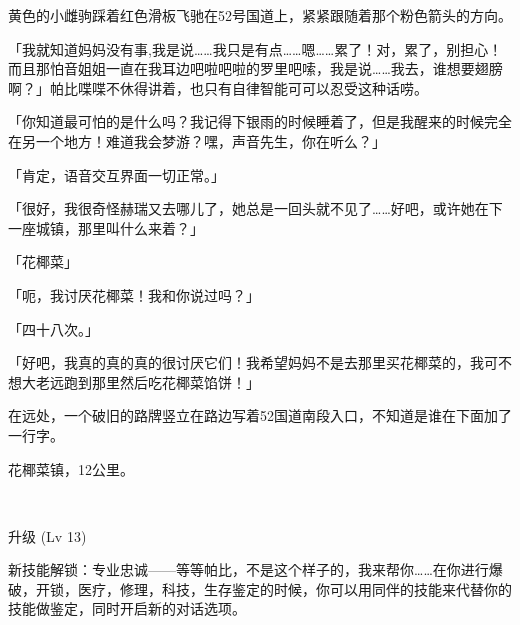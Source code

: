 黄色的小雌驹踩着红色滑板飞驰在52号国道上，紧紧跟随着那个粉色箭头的方向。

「我就知道妈妈没有事,我是说……我只是有点……嗯……累了！对，累了，别担心！而且那怕音姐姐一直在我耳边吧啦吧啦的罗里吧嗦，我是说……我去，谁想要翅膀啊？」帕比喋喋不休得讲着，也只有自律智能可可以忍受这种话唠。

「你知道最可怕的是什么吗？我记得下银雨的时候睡着了，但是我醒来的时候完全在另一个地方！难道我会梦游？嘿，声音先生，你在听么？」

「{\mt 肯定，语音交互界面一切正常。}」

「很好，我很奇怪赫瑞又去哪儿了，她总是一回头就不见了……好吧，或许她在下一座城镇，那里叫什么来着？」

「{\mt 花椰菜}」

「呃，我讨厌花椰菜！我和你说过吗？」

「{\mt 四十八次。}」

「好吧，我真的真的真的很讨厌它们！我希望妈妈不是去那里买花椰菜的，我可不想大老远跑到那里然后吃花椰菜馅饼！」

在远处，一个破旧的路牌竖立在路边写着52国道南段入口，不知道是谁在下面加了一行字。

\begin{center}
    花椰菜镇，12公里。
\end{center}

~\vfill

\begin{note}
    升级 (Lv 13) 

    新技能解锁：专业忠诚——等等帕比，不是这个样子的，我来帮你……在你进行爆破，开锁，医疗，修理，科技，生存鉴定的时候，你可以用同伴的技能来代替你的技能做鉴定，同时开启新的对话选项。
\end{note}



